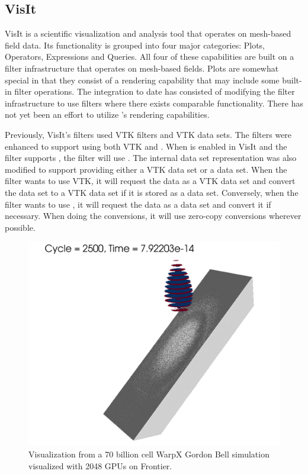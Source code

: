 \subsection{VisIt}

VisIt is a scientific visualization and analysis tool that operates on mesh-based field data. Its functionality is grouped into four major categories: Plots, Operators, Expressions and Queries. All four of these capabilities are built on a filter infrastructure that operates on mesh-based fields. Plots are somewhat special in that they consist of a rendering capability that may include some built-in filter operations. The \vtkm integration to date has consisted of modifying the filter infrastructure to use \vtkm filters where there exists comparable \vtkm functionality. There has not yet been an effort to utilize \vtkm's rendering capabilities.

Previously, VisIt's filters used VTK filters and VTK data sets. The filters were enhanced to support using both VTK and \vtkm. When \vtkm is enabled in VisIt and the filter supports \vtkm, the filter will use \vtkm. The internal data set representation was also modified to support providing either a VTK data set or a \vtkm data set. When the filter wants to use VTK, it will request the data as a VTK data set and convert the data set to a VTK data set if it is stored as a \vtkm data set. Conversely, when the filter wants to use \vtkm, it will request the data as a \vtkm data set and convert it if necessary. When doing the conversions, it will use zero-copy conversions wherever possible.

\begin{figure}[htb]
  \includegraphics[width=\linewidth]{figures/visit_warpx_frontier.png}
  \caption{Visualization from a 70 billion cell WarpX Gordon Bell simulation~\cite{FedeliHuebl2022} visualized with 2048 GPUs on Frontier.}
  \label{fig:visit_warpx_frontier}
\end{figure}

